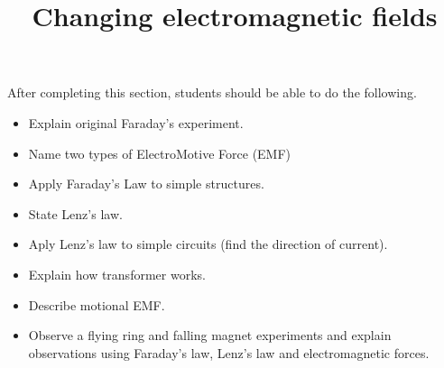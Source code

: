 \documentclass{ximera}
\title{Changing electromagnetic fields}
\begin{document}
\begin{abstract}
\end{abstract}

\maketitle

\begin{sectionOutcomes}

After completing this section, students should be able to do the following.

\begin{itemize}
\item Explain original Faraday's experiment.
\item Name two types of ElectroMotive Force (EMF)
\item Apply Faraday's Law to simple structures.
\item State Lenz's law.
\item Aply Lenz's law to simple circuits (find the direction of current).
\item Explain how transformer works.
\item Describe motional EMF.
\item Observe a flying ring and falling magnet experiments and explain observations using Faraday's law, Lenz's law and electromagnetic forces.
\end{itemize}

\end{sectionOutcomes}
\end{document}
